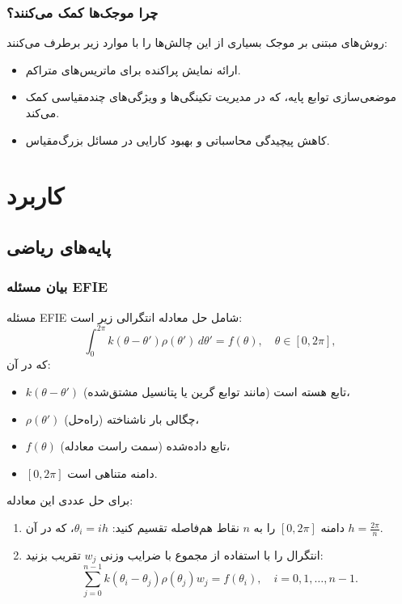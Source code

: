 \documentclass[12pt,a4paper]{article}
\begin{document}
\subsubsection{چرا موجک‌ها کمک می‌کنند؟}
روش‌های مبتنی بر موجک بسیاری از این چالش‌ها را با موارد زیر برطرف می‌کنند:
\begin{itemize}
    \item ارائه نمایش پراکنده برای ماتریس‌های متراکم.
    \item موضعی‌سازی توابع پایه، که در مدیریت تکینگی‌ها و ویژگی‌های چندمقیاسی کمک می‌کند.
    \item کاهش پیچیدگی محاسباتی و بهبود کارایی در مسائل بزرگ‌مقیاس.
\end{itemize}

\newpage

\section{کاربرد}

\subsection{پایه‌های ریاضی}

\subsubsection{بیان مسئله EFIE}
مسئله EFIE شامل حل معادله انتگرالی زیر است:
\[
    \int_0^{2\pi} k(\theta - \theta') \rho(\theta') \, d\theta' = f(\theta), \quad \theta \in [0, 2\pi],
\]
که در آن:
\begin{itemize}
    \item \(k(\theta - \theta')\) تابع هسته است (مانند توابع گرین یا پتانسیل مشتق‌شده)،
    \item \(\rho(\theta')\) چگالی بار ناشناخته (راه‌حل)،
    \item \(f(\theta)\) تابع داده‌شده (سمت راست معادله)،
    \item \([0, 2\pi]\) دامنه متناهی است.
\end{itemize}

برای حل عددی این معادله:
\begin{enumerate}
    \item دامنه \([0, 2\pi]\) را به \(n\) نقاط هم‌فاصله تقسیم کنید: \(\theta_i = i h\)، که در آن \(h = \frac{2\pi}{n}\).
    \item انتگرال را با استفاده از مجموع با ضرایب وزنی \(w_j\) تقریب بزنید:
          \[
              \sum_{j=0}^{n-1} k(\theta_i - \theta_j) \rho(\theta_j) w_j = f(\theta_i), \quad i = 0, 1, \dots, n-1.
          \]
\end{enumerate}
\end{document}
